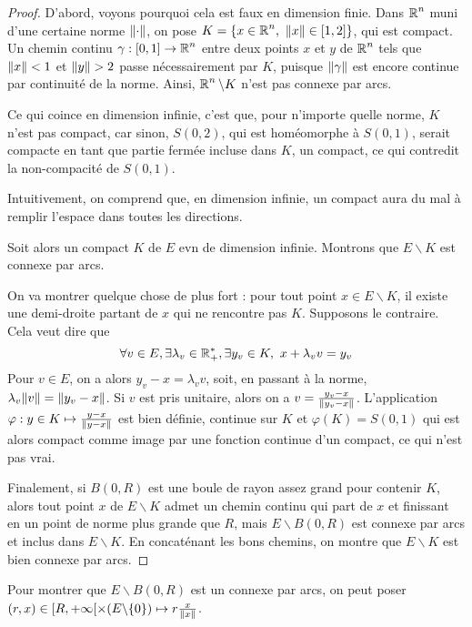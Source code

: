 \documentclass[10pt]{scrartcl}
\begin{document}
    \begin{proof}
        D'abord, voyons pourquoi cela est faux en dimension finie. 
        Dans $\operatorname{\mathbb R}^n$ muni d'une certaine norme $\lVert \cdot\rVert$, on pose $K=\lbrace x\in\R^n,\ \norm{x}\in[1,2]\rbrace$, qui est compact. 
        Un chemin continu $\gamma:[0,1]\to \operatorname{\mathbb R}^n$ entre deux points $x$ et $y$ de $\operatorname{\mathbb R}^n$ tels que $\lVert x\rVert<1$ et $\lVert y\rVert>2$ passe nécessairement par $K$, puisque $\lVert \gamma\rVert$ est encore continue par continuité de la norme. 
        Ainsi, $\operatorname{\mathbb R}^n\backslash K$ n'est pas connexe par arcs. 

        Ce qui coince en dimension infinie, c'est que, pour n'importe quelle norme, $K$ n'est pas compact, car sinon, $S(0,2)$, qui est homéomorphe à $S(0,1)$, serait compacte en tant que partie fermée incluse dans $K$, un compact,
        ce qui contredit la non-compacité de $S(0,1)$. 

        Intuitivement, on comprend que, en dimension infinie, un compact aura du mal à remplir l'espace dans toutes les directions.
        
        Soit alors un compact $K$ de $E$ evn de dimension infinie. Montrons que $E\backslash K$ est connexe par arcs. 

        On va montrer quelque chose de plus fort : pour tout point $x\in E\backslash K$, il existe une demi-droite partant de $x$ qui ne rencontre pas $K$. 
        Supposons le contraire. Cela veut dire que 
        \[
            \forall v\in E, \exists\lambda_v\in\operatorname{\mathbb R}_+^*,\exists y_v\in K,\ x+\lambda_vv=y_v
        \]
        Pour $v\in E$, on a alors $y_v-x=\lambda_vv$, soit, en passant à la norme, $\lambda_v\lVert v\rVert=\lVert y_v-x\rVert$. 
        Si $v$ est pris unitaire, alors on a $v=\frac{y_v-x}{\lVert y_v-x\rVert}$.
        L'application $\varphi:y\in K\mapsto \frac{y-x}{\lVert y-x\rVert}$ est bien définie, continue sur $K$ et $\varphi(K)=S(0,1)$ qui est alors compact comme image par une fonction continue d'un compact, ce qui n'est pas vrai.

        Finalement, si $B(0,R)$ est une boule de rayon assez grand pour contenir $K$, alors tout point $x$ de $E\backslash K$ admet un chemin continu qui part de $x$ et finissant en un point de norme plus grande que $R$, mais $E\backslash B(0,R)$ est connexe par arcs et inclus dans $E\backslash K$. 
        En concaténant les bons chemins, on montre que $E\backslash K$ est bien connexe par arcs.
    \end{proof}

    \begin{remarks}
        Pour montrer que $E\backslash B(0,R)$ est un connexe par arcs, on peut poser $(r,x)\in[R,+\infty[\times(E\backslash\lbrace 0\rbrace)\mapsto r\frac x{\lVert x\rVert}$.
    \end{remarks}
\end{document}
